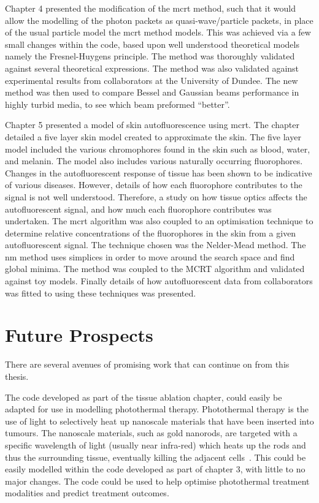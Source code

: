 \medskip

Chapter 4 presented the modification of the \gls*{mcrt} method, such that it would allow the modelling of the photon packets as quasi-wave/particle packets, in place of the usual particle model the \gls*{mcrt} method models.
This was achieved via a few small changes within the code, based upon well understood theoretical models namely the Fresnel-Huygens principle.
The method was thoroughly validated against several theoretical expressions.
The method was also validated against experimental results from collaborators at the University of Dundee.
The new method was then used to compare Bessel and Gaussian beams performance in highly turbid media, to see which beam preformed ``better''.
\medskip

Chapter 5 presented a model of skin autofluorescence using \gls*{mcrt}.
The chapter detailed a five layer skin model created to approximate the skin.
The five layer model included the various chromophores found in the skin such as blood, water, and melanin.
The model also includes various naturally occurring fluorophores.
Changes in the autofluorescent response of tissue has been shown to be indicative of various diseases.
However, details of how each fluorophore contributes to the signal is not well understood.
Therefore, a study on how tissue optics affects the autofluorescent signal, and how much each fluorophore contributes was undertaken.
The \gls*{mcrt} algorithm was also coupled to an optimisation technique to determine relative concentrations of the fluorophores in the skin from a given autofluorescent signal.
The technique chosen was the Nelder-Mead method.
The \gls*{nm} method uses simplices in order to move around the search space and find global minima.
The method was coupled to the MCRT algorithm and validated against toy models.
Finally details of how autofluorescent data from collaborators was fitted to using these techniques was presented.

\section{Future Prospects}

There are several avenues of promising work that can continue on from this thesis.

The code developed as part of the tissue ablation chapter, could easily be adapted for use in modelling photothermal therapy.
Photothermal therapy is the use of light to selectively heat up nanoscale materials that have been inserted into tumours.
The nanoscale materials, such as gold nanorods, are targeted with a specific wavelength of light (usually near infra-red) which heats up the rods and thus the surrounding tissue, eventually killing the adjacent cells~\cite{singh2016application,gallina2016aptamer}.
This could be easily modelled within the code developed as part of chapter 3, with little to no major changes.
The code could be used to help optimise photothermal treatment modalities and predict treatment outcomes.

